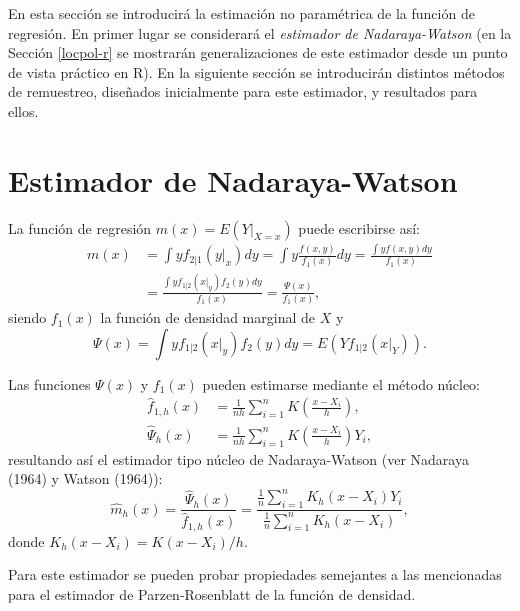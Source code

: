 \documentclass[]{book}
\theoremstyle{break}
\theoremstyle{definition}
\theoremstyle{definition}
\theoremstyle{definition}
\theoremstyle{remark}
\begin{document}
En esta sección se introducirá la estimación no paramétrica de la
función de regresión. En primer lugar se considerará el \emph{estimador
de Nadaraya-Watson} (en la Sección \ref{locpol-r} se mostrarán
generalizaciones de este estimador desde un punto de vista práctico en
R). En la siguiente sección se introducirán distintos métodos de
remuestreo, diseñados inicialmente para este estimador, y resultados
para ellos.

\section{Estimador de Nadaraya-Watson}\label{nadaraya-watson}

La función de regresión
\(m\left( x \right) =E\left( \left. Y\right\vert_{X=x} \right)\) puede
escribirse así: \[\begin{aligned}
m\left( x \right) &= \int yf_{2|1}\left( \left. y\right\vert _{x} \right)
dy=\int y\frac{f\left( x,y \right)}{f_1\left( x \right)}dy=\frac{\int
yf\left( x,y \right) dy}{f_1\left( x \right)} \\
&= \frac{\int yf_{1|2}\left( \left. x\right\vert _{y} \right) f_2\left(
y \right) dy}{f_1\left( x \right)}=\frac{\Psi \left( x \right)}{f_1\left(
x \right)},
\end{aligned}\] siendo \(f_1\left( x \right)\) la función de densidad
marginal de \(X\) y
\[\Psi \left( x \right) =\int yf_{1|2}\left( \left. x\right\vert _{y} \right)
f_2\left( y \right) dy=E\left( Yf_{1|2}\left( \left. x\right\vert_{Y} \right)
\right).\]

Las funciones \(\Psi \left( x \right)\) y \(f_1\left( x \right)\) pueden
estimarse mediante el método núcleo: \[\begin{aligned}
\hat{f}_{1,h}\left( x \right) &= \frac{1}{nh}\sum_{i=1}^{n}K\left( \frac{
x-X_i}{h} \right), \\
\hat{\Psi}_{h}\left( x \right) &= \frac{1}{nh}\sum_{i=1}^{n}K\left( \frac{
x-X_i}{h} \right) Y_i,
\end{aligned}\] resultando así el estimador tipo núcleo de
Nadaraya-Watson (ver Nadaraya (1964) y Watson (1964)):
\[\hat{m}_{h}\left( x \right) =\frac{\hat{\Psi}_{h}\left( x \right)}{\hat{f}
_{1,h}\left( x \right)}=\frac{\frac{1}{n}\sum_{i=1}^{n}K_{h}\left(
x-X_i \right) Y_i}{\frac{1}{n}\sum_{i=1}^{n}K_{h}\left( x-X_i \right)},\]
donde \(K_{h}\left( x-X_i \right) = K\left( x-X_i \right)/h\).

Para este estimador se pueden probar propiedades semejantes a las
mencionadas para el estimador de Parzen-Rosenblatt de la función de
densidad.
\end{document}
